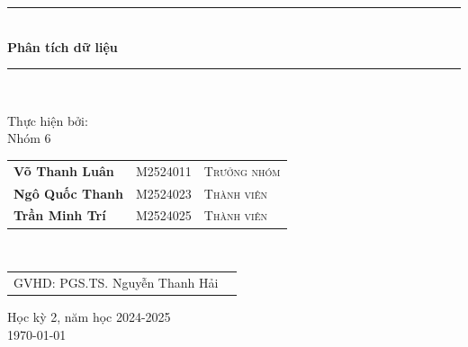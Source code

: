 \documentclass[12pt]{book}
\newcommand{\HRule}{\rule{\linewidth}{0.7mm}}
\newcommand{\Hrule}{\rule{\linewidth}{0.3mm}}
\begin{document}
\begin{titlepage}
\begin{center}
	 		\HRule \\[0.1cm]
	 		 { \LARGE \bfseries Phân tích dữ liệu}
	  		\Hrule \\
		
		\end{center}
		
		\vfill
			
		\begin{center}
			
  	\large	Thực hiện bởi: \\[1cm] 
	 \Large 	Nhóm 6 \\ %
			\begin{tabular}{lll}
\textbf{Võ Thanh Luân}  &  \textsc{M2524011} & \textsc{Trưởng nhóm} \\
	\textbf{Ngô Quốc Thanh}  &  \textsc{M2524023} & \textsc{Thành viên} \\
	\textbf{Trần Minh Trí}  &  \textsc{M2524025} & \textsc{Thành viên} \\
				
			\end{tabular}
	\\[1cm] 
			\begin{tabular}{ll}
			      GVHD:  PGS.TS. Nguyễn Thanh Hải \\
				
			\end{tabular}

      
   
		

		
	
			
			\vspace{1cm}	
  \normalsize Học kỳ 2, năm học 2024-2025\\
\normalsize \today 		%
   \end{center}
	\end{titlepage}



\pagestyle{fancy}

\fancyhead{}

\renewcommand{\chaptermark}[1]{\markboth{\textsc{#1}}{}}


\frontmatter

\tableofcontents
{}

\listoffigures
{}

\listoftables
{}
\end{document}
